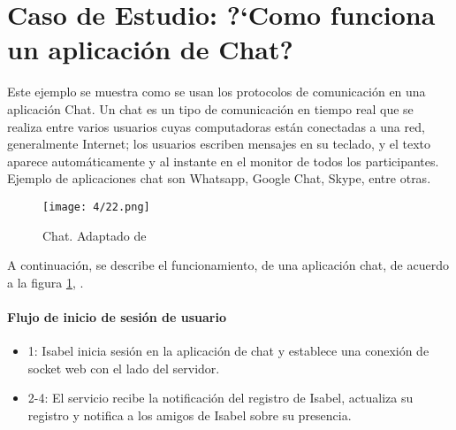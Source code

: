 

\section{Caso de Estudio: ?`Como funciona un aplicación de Chat?}

Este ejemplo se muestra como se usan los protocolos de comunicación en una aplicación Chat.
Un chat es un tipo de comunicación en tiempo real que se realiza entre varios usuarios cuyas computadoras están conectadas a una red, generalmente Internet; los usuarios escriben mensajes en su teclado, y el texto aparece automáticamente y al instante en el monitor de todos los participantes.
Ejemplo de aplicaciones chat son Whatsapp, Google Chat, Skype, entre otras.

\begin{figure}
	\texttt{[image: 4/22.png]}
	\caption{Chat. Adaptado de {\cite{Xu2022}}}
	\label{fig:chat}
\end{figure}

A continuación, se describe el funcionamiento, de una aplicación chat, de acuerdo a la  figura \ref{fig:chat}, .

\paragraph{Flujo de inicio de sesión de usuario}

\begin{itemize}
	\item 1: Isabel inicia sesión en la aplicación de chat y establece una conexión de socket web con el lado del servidor.
	\item 2-4: El servicio  recibe  la notificación del registro de Isabel, actualiza su registro y notifica a los amigos de Isabel sobre su presencia.
\end{itemize}

